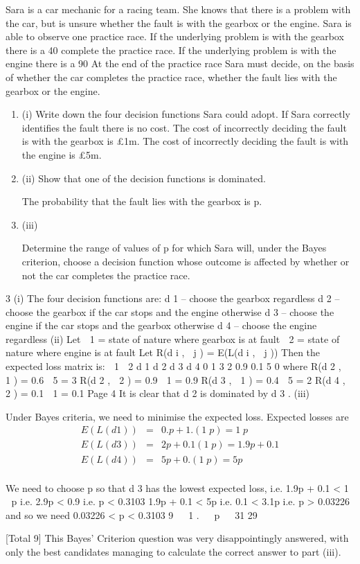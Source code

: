 \documentclass[a4paper,12pt]{article}
\begin{document}
Sara is a car mechanic for a racing team. She knows that there is a problem with the
car, but is unsure whether the fault is with the gearbox or the engine. Sara is able to
observe one practice race.
If the underlying problem is with the gearbox there is a 40%
complete the practice race. If the underlying problem is with the engine there is a
90%
At the end of the practice race Sara must decide, on the basis of whether the car
completes the practice race, whether the fault lies with the gearbox or the engine.
\begin{enumerate}
\item (i)
Write down the four decision functions Sara could adopt.
\medskip 
If Sara correctly identifies the fault there is no cost. The cost of incorrectly deciding
the fault is with the gearbox is £1m. The cost of incorrectly deciding the fault is with
the engine is £5m.
\item (ii)
Show that one of the decision functions is dominated.

The probability that the fault lies with the gearbox is p.
\item (iii)

Determine the range of values of p for which Sara will, under the Bayes
criterion, choose a decision function whose outcome is affected by whether or
not the car completes the practice race.
\end{enumerate}

\newpage


3
(i)
The four decision functions are:
d 1 – choose the gearbox regardless
d 2 – choose the gearbox if the car stops and the engine otherwise
d 3 – choose the engine if the car stops and the gearbox otherwise
d 4 – choose the engine regardless
(ii)
Let  1 = state of nature where gearbox is at fault
 2 = state of nature where engine is at fault
Let R(d i ,  j ) = E(L(d i ,  j ))
Then the expected loss matrix is:
 1
 2
d 1 d 2 d 3 d 4
0
1 3
2
0.9 0.1 5
0
where
R(d 2 ,  1 ) = 0.6  5 = 3
R(d 2 ,  2 ) = 0.9  1 = 0.9
R(d 3 ,  1 ) = 0.4  5 = 2
R(d 4 ,  2 ) = 0.1  1 = 0.1
Page 4
It is clear that d 2 is dominated by d 3 .
(iii)

Under Bayes criteria, we need to minimise the expected loss.
Expected losses are
\begin{eqnarray*}
E(L(d 1 )) &=& 0.p + 1.(1  p) = 1  p
\\E(L(d 3 )) &=& 2p + 0.1(1  p) = 1.9p + 0.1\\
E(L(d 4 )) &=& 5p + 0.(1  p) = 5p\\
\end{eqnarray*}

We need to choose p so that d 3 has the lowest expected loss, i.e.
1.9p + 0.1 < 1  p i.e. 2.9p < 0.9 i.e. p < 0.3103
1.9p + 0.1 < 5p i.e. 0.1 < 3.1p i.e. p > 0.03226
and
so we need 0.03226 < p < 0.3103
9 
 1
.


p
  31
29  

[Total 9]
This Bayes’ Criterion question was very disappointingly answered, with only the best
candidates managing to calculate the correct answer to part (iii).
\end{document}
